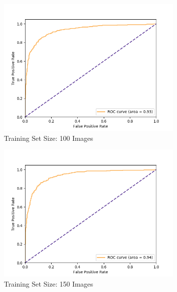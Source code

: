 \begin{figure}[!h]
\begin{subfigure}{.48\textwidth}
        \includegraphics[width=\textwidth]{images/score-50-roc.png}
        \caption{Training Set Size: 100 Images}
    \end{subfigure}
    \begin{subfigure}{.48\textwidth}
        \includegraphics[width=\textwidth]{images/score-75-roc.png}
        \caption{Training Set Size: 150 Images}
    \end{subfigure}
    \begin{subfigure}{.48\textwidth}

\end{subfigure}
\end{figure}
